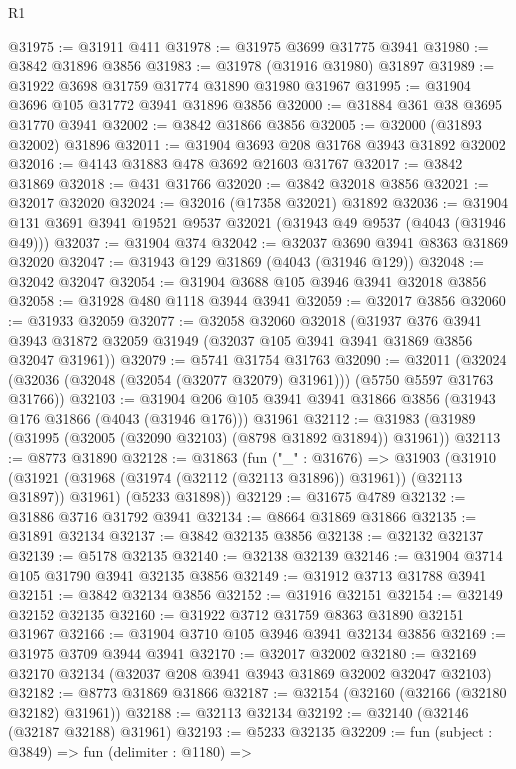 \begin{lexlean}{R1}
\begin{coremodule}
@31975 := @31911 @411
@31978 := @31975 @3699 @31775 @3941
@31980 := @3842 @31896 @3856
@31983 := @31978 (@31916 @31980) @31897
@31989 := @31922 @3698 @31759 @31774 @31890 @31980 @31967
@31995 := @31904 @3696 @105 @31772 @3941 @31896 @3856
@32000 := @31884 @361 @38 @3695 @31770 @3941
@32002 := @3842 @31866 @3856
@32005 := @32000 (@31893 @32002) @31896
@32011 := @31904 @3693 @208 @31768 @3943 @31892 @32002
@32016 := @4143 @31883 @478 @3692 @21603 @31767
@32017 := @3842 @31869
@32018 := @431 @31766
@32020 := @3842 @32018 @3856
@32021 := @32017 @32020
@32024 := @32016 (@17358 @32021) @31892
@32036 := @31904 @131 @3691 @3941 @19521 @9537 @32021 (@31943 @49 @9537 (@4043 (@31946 @49)))
@32037 := @31904 @374
@32042 := @32037 @3690 @3941 @8363 @31869 @32020
@32047 := @31943 @129 @31869 (@4043 (@31946 @129))
@32048 := @32042 @32047
@32054 := @31904 @3688 @105 @3946 @3941 @32018 @3856
@32058 := @31928 @480 @1118 @3944 @3941
@32059 := @32017 @3856
@32060 := @31933 @32059
@32077 := @32058
    @32060
    @32018
    (@31937
      @376
      @3941
      @3943
      @31872
      @32059
      @31949
      (@32037 @105 @3941 @3941 @31869 @3856 @32047 @31961))
@32079 := @5741 @31754 @31763
@32090 := @32011
    (@32024 (@32036 (@32048 (@32054 (@32077 @32079) @31961))) (@5750 @5597 @31763 @31766))
@32103 := @31904
    @206
    @105
    @3941
    @3941
    @31866
    @3856
    (@31943 @176 @31866 (@4043 (@31946 @176)))
    @31961
@32112 := @31983 (@31989 (@31995 (@32005 (@32090 @32103) (@8798 @31892 @31894)) @31961))
@32113 := @8773 @31890
@32128 := @31863
    (fun ("_" : @31676) =>
    @31903
      (@31910 (@31921 (@31968 (@31974 (@32112 (@32113 @31896)) @31961)) (@32113 @31897)) @31961)
      (@5233 @31898))
@32129 := @31675 @4789
@32132 := @31886 @3716 @31792 @3941
@32134 := @8664 @31869 @31866
@32135 := @31891 @32134
@32137 := @3842 @32135 @3856
@32138 := @32132 @32137
@32139 := @5178 @32135
@32140 := @32138 @32139
@32146 := @31904 @3714 @105 @31790 @3941 @32135 @3856
@32149 := @31912 @3713 @31788 @3941
@32151 := @3842 @32134 @3856
@32152 := @31916 @32151
@32154 := @32149 @32152 @32135
@32160 := @31922 @3712 @31759 @8363 @31890 @32151 @31967
@32166 := @31904 @3710 @105 @3946 @3941 @32134 @3856
@32169 := @31975 @3709 @3944 @3941
@32170 := @32017 @32002
@32180 := @32169 @32170 @32134 (@32037 @208 @3941 @3943 @31869 @32002 @32047 @32103)
@32182 := @8773 @31869 @31866
@32187 := @32154 (@32160 (@32166 (@32180 @32182) @31961))
@32188 := @32113 @32134
@32192 := @32140 (@32146 (@32187 @32188) @31961)
@32193 := @5233 @32135
@32209 := fun (subject : @3849) =>
  fun (delimiter : @1180) =>

\end{coremodule}
\end{lexlean}
